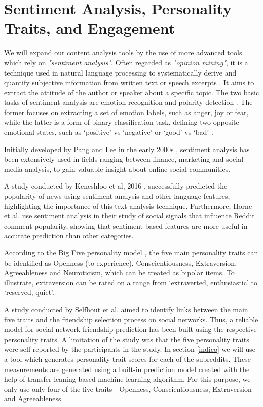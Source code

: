 \documentclass[bsc,frontabs,twoside,singlespacing,parskip,deptreport]{infthesis}
\begin{document}
\section{Sentiment Analysis, Personality Traits, and Engagement}\label{sentiment-analysis}

We will expand our content analysis tools by the use of more advanced tools which rely on \textit{"sentiment analysis"}. Often regarded as \textit{"opinion mining"}, it is a technique used in natural language processing to systematically derive and quantify subjective information from written text or speech excerpts \cite{sentiment4} \cite{sentiment5}. It aims to extract the attitude of the author or speaker about a specific topic. The two basic tasks of sentiment analysis are emotion recognition and polarity detection \cite{sentiment4}. The former focuses on extracting a set of emotion labels, such as anger, joy or fear, while the latter is a form of binary classification task, defining two opposite emotional states, such as ‘positive’ vs ‘negative’ or ‘good’ vs ‘bad' \cite{sentiment4}. 

Initially developed by Pang and Lee in the early 2000s \cite{sentiment2}, sentiment analysis has been extensively used in fields ranging between finance, marketing and social media analysis, to gain valuable insight about online social communities. 

A study conducted by Keneshloo et al, 2016 \cite{sentiment14}, successfully predicted the popularity of news using sentiment analysis and other language features, highlighting the importance of this text analysis technique. Furthermore, Horne et al. \cite{sentiment3} use sentiment analysis in their study of social signals that influence Reddit comment popularity, showing that sentiment based features are more useful in accurate prediction than other categories. 

According to the Big Five personality model \cite{sentiment6.1} \cite{sentiment6.2}, the five main personality traits can be identified as Openness (to experience), Conscientiousness, Extraversion, Agreeableness and Neuroticism, which can be treated as bipolar items. To illustrate, extraversion can be rated on a range from ‘extraverted, enthusiastic’ to ‘reserved, quiet’.

A study conducted by Selfhout et al. \cite{sentiment7} aimed to identify links between the main five traits and the friendship selection process on social networks. Thus, a reliable model for social network friendship prediction has been built using the respective personality traits. A limitation of the study was that the five personality traits were self reported by the participants in the study. In section \ref{indico} we will use a tool which generates personality trait scores for each of the subreddits. These measurements are generated using a built-in prediction model created with the help of transfer-leaning based machine learning algorithm. For this purpose, we only use only four of the five traits - Openness, Conscientiousness, Extraversion and Agreeableness. 
\end{document}
